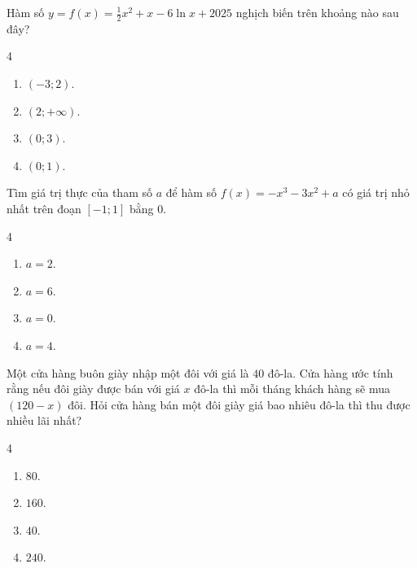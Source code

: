 \begin{baitap}
	Hàm số $y = f(x) = \frac{1}{2}x^2 + x - 6\ln x + 2025$ nghịch biến trên khoảng nào sau đây?
	\begin{multicols}{4}
		\begin{enumerate}[\quad \bf A.]
			\item $(-3; 2)$.
			\item $(2; +\infty)$.
			\item $(0; 3)$.
			\item $(0; 1)$.
		\end{enumerate}
	\end{multicols}
\end{baitap}

\begin{baitap}
	Tìm giá trị thực của tham số $a$ để hàm số $f(x) = -x^3 - 3x^2 + a$ có giá trị nhỏ nhất trên đoạn $[-1; 1]$ bằng $0$.
	\begin{multicols}{4}
		\begin{enumerate}[\quad \bf A.]
			\item $a = 2$.
			\item $a = 6$.
			\item $a = 0$.
			\item $a = 4$.
		\end{enumerate}
	\end{multicols}
\end{baitap}

\begin{baitap}
	Một cửa hàng buôn giày nhập một đôi với giá là $40$ đô-la. Cửa hàng ước tính rằng nếu đôi giày được bán với giá $x$ đô-la thì mỗi tháng khách hàng sẽ mua $(120 - x)$ đôi. Hỏi cửa hàng bán một đôi giày giá bao nhiêu đô-la thì thu được nhiều lãi nhất?
	\begin{multicols}{4}
		\begin{enumerate}[\quad \bf A.]
			\item $80$.
			\item $160$.
			\item $40$.
			\item $240$.
		\end{enumerate}
	\end{multicols}
\end{baitap}

